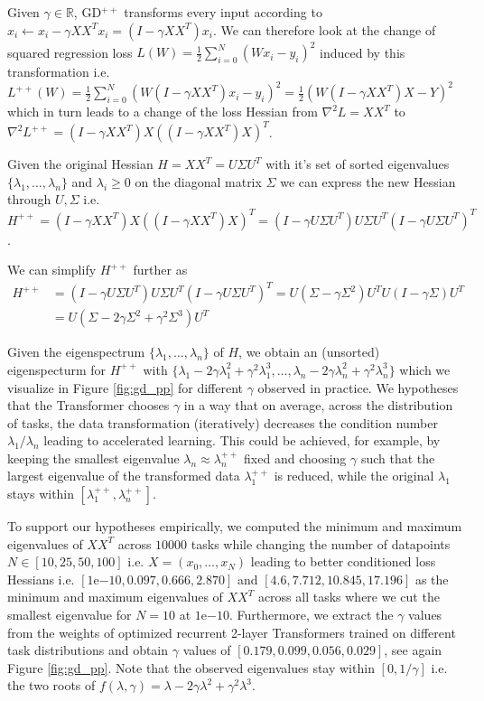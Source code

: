 \documentclass{article}
\theoremstyle{plain}
\theoremstyle{definition}
\theoremstyle{remark}
\begin{document}
Given $\gamma \in \mathbb{R}$, GD$^{++}$ transforms every input according to $x_i \leftarrow x_i-\gamma XX^Tx_i = (I-\gamma XX^T)x_i$. We can therefore look at the change of squared regression loss $L(W) = \frac{1}{2}\sum_{i=0}^N (Wx_i -y_i)^2$ induced by this transformation i.e. $L^{++}(W) = \frac{1}{2}\sum_{i=0}^N (W(I-\gamma XX^T)x_i -y_i)^2 = \frac{1}{2}(W(I-\gamma XX^T)X-Y)^2$ which in turn leads to a change of the loss Hessian from $\nabla^2 L = XX^T$ to 
$\nabla^2 L^{++} = (I-\gamma XX^T)X((I-\gamma XX^T)X)^T$.

Given the original Hessian $H = XX^T = U\Sigma U^T$ with it's set of sorted eigenvalues $\{\lambda_1, \dots , \lambda_n\}$ and $\lambda_i \geq 0$ on the diagonal matrix $\Sigma$ we can express the new Hessian through $U, \Sigma$ i.e. $H^{++} = (I-\gamma XX^T)X((I-\gamma XX^T)X)^T = (I-\gamma U\Sigma U^T)U\Sigma U^T(I-\gamma U\Sigma U^T)^T$. 

We can simplify $H^{++}$ further as
\begin{align}
    H^{++} &= (I-\gamma U\Sigma U^T)U\Sigma U^T(I-\gamma U\Sigma U^T)^T = U (\Sigma - \gamma \Sigma^2) U^T U (I - \gamma \Sigma) U^T \\ &= U (\Sigma - 2 \gamma \Sigma^2 + \gamma^2 \Sigma^3) U^T
\end{align}

Given the eigenspectrum $\{\lambda_1, \dots , \lambda_n\}$ of $H$, we obtain an (unsorted) eigenspecturm for $H^{++}$ with  $\{\lambda_1 - 2\gamma \lambda_1^2 + \gamma^2 \lambda_1^3, \dots , \lambda_n - 2\gamma \lambda_n^2 + \gamma^2 \lambda_n^3\}$ which we visualize in Figure  \ref{fig:gd_pp} for different $\gamma$ observed in practice. We hypotheses that the Transformer chooses $\gamma$ in a way that on average, across the distribution of tasks, the data transformation (iteratively) decreases the condition number $\lambda_1/\lambda_n$ leading to accelerated learning. This could be achieved, for example, by keeping the smallest eigenvalue $\lambda_n \approx \lambda_n^{++}$ fixed and choosing $\gamma$ such that the largest eigenvalue of the transformed data $\lambda_1^{++}$ is reduced, while the original $\lambda_1$ stays within $[\lambda_1^{++}, \lambda_n^{++}]$.

To support our hypotheses empirically, we computed the minimum and maximum eigenvalues of $XX^T$ across $10000$ tasks while changing the number of datapoints $N \in [10, 25, 50, 100]$ i.e. $X=(x_0, \dots, x_N)$ leading to better conditioned loss Hessians i.e. $[1\mathrm{e}{-10}, 0.097, 0.666, 2.870]$ and $[4.6, 7.712, 10.845, 17.196]$ as the minimum and maximum eigenvalues of $XX^T$ across all tasks where we cut the smallest eigenvalue for $N=10$ at $1\mathrm{e}{-10}$.
Furthermore, we extract the $\gamma$ values from the weights of optimized recurrent 2-layer Transformers trained on different task distributions and obtain $\gamma$ values of $[0.179, 0.099, 0.056, 0.029]$, see again Figure \ref{fig:gd_pp}. Note that the observed eigenvalues stay within $[0, 1/\gamma]$ i.e. the two roots of $f(\lambda, \gamma) = \lambda - 2\gamma \lambda^2 + \gamma^2 \lambda^3$.
\end{document}
